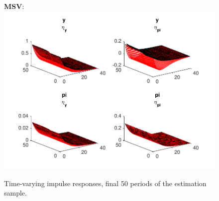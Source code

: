 \documentclass[12pt,reqno]{article}
\numberwithin{equation}{section}
\begin{document}
\begin{figure}[H]
\caption{Time-varying impulse responses, final 50 periods of the estimation sample.}

\textbf{MSV}: \\
\includegraphics[scale=1]{NKPC_ree_init_MSV_IR_timeVarying.pdf}\\
\end{figure}
\end{document}
